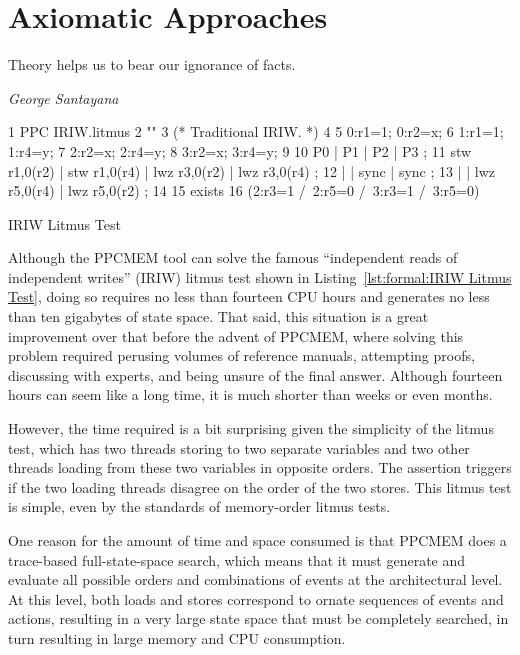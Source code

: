 
\section{Axiomatic Approaches}
\label{sec:formal:Axiomatic Approaches}
%
\epigraph{Theory helps us to bear our ignorance of facts.}
	{\emph{George Santayana}}

\begin{listing*}[tb]
{ \scriptsize
\begin{verbbox}
 1 PPC IRIW.litmus
 2 ""
 3 (* Traditional IRIW. *)
 4 {
 5 0:r1=1; 0:r2=x;
 6 1:r1=1;         1:r4=y;
 7         2:r2=x; 2:r4=y;
 8         3:r2=x; 3:r4=y;
 9 }
10 P0           | P1           | P2           | P3           ;
11 stw r1,0(r2) | stw r1,0(r4) | lwz r3,0(r2) | lwz r3,0(r4) ;
12              |              | sync         | sync         ;
13              |              | lwz r5,0(r4) | lwz r5,0(r2) ;
14 
15 exists
16 (2:r3=1 /\ 2:r5=0 /\ 3:r3=1 /\ 3:r5=0)
\end{verbbox}
}
\centering
\theverbbox
\caption{IRIW Litmus Test}
\label{lst:formal:IRIW Litmus Test}
\end{listing*}

Although the PPCMEM tool can solve the famous ``independent reads of
independent writes'' (IRIW) litmus test shown in
Listing~\ref{lst:formal:IRIW Litmus Test}, doing so requires no less than
fourteen CPU hours and generates no less than ten gigabytes of state space.
That said, this situation is a great improvement over that before the advent
of PPCMEM, where solving this problem required perusing volumes of
reference manuals, attempting proofs, discussing with experts, and
being unsure of the final answer.
Although fourteen hours can seem like a long time, it is much shorter
than weeks or even months.

However, the time required is a bit surprising given the simplicity
of the litmus test, which has two threads storing to two separate variables
and two other threads loading from these two variables in opposite
orders.
The assertion triggers if the two loading threads disagree on the order
of the two stores.
This litmus test is simple, even by the standards of memory-order litmus
tests.

One reason for the amount of time and space consumed is that PPCMEM does
a trace-based full-state-space search, which means that it must generate
and evaluate all possible orders and combinations of events at the
architectural level.
At this level, both loads and stores correspond to ornate sequences
of events and actions, resulting in a very large state space that must
be completely searched, in turn resulting in large memory and CPU
consumption.


